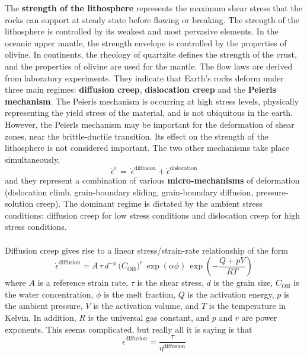 \documentclass[letterpaper,12pt,]{memoir}
\begin{document}
The \textbf{strength of the lithosphere} represents the maximum shear stress that the rocks can support at steady state before flowing or breaking. The strength of the lithosphere is controlled by its weakest and most pervasive elements. In the oceanic upper mantle, the strength envelope is controlled by the properties of olivine. In continents, the rheology of quartzite defines the strength of the crust, and the properties of olivine are used for the mantle. The flow laws are derived from laboratory experiments. They indicate that Earth's rocks deform under three main regimes: \textbf{diffusion creep}, \textbf{dislocation creep} and the \textbf{Peierls mechanism}. The Peierls mechanism is occurring at high stress levels, physically representing the yield stress of the material, and is not ubiquitous in the earth. However, the Peierls mechanism may be important for the deformation of shear zones, near the brittle-ductile transition. Its effect on the strength of the lithosphere is not considered important. The two other mechanisms take place simultaneously, 
\begin{equation}
\dot{\epsilon}^i\,=~\dot{\epsilon}^\text{diffusion}+\dot{\epsilon}^\text{dislocation}
\end{equation}
and they represent a combination of various \textbf{micro-mechanisms} of deformation (dislocation climb, grain-boundary sliding, grain-boundary diffusion, pressure-solution creep). The dominant regime is dictated by the ambient stress conditions: diffusion creep for low stress conditions and dislocation creep for high stress conditions.\\
\\
Diffusion creep gives rise to a linear stress/strain-rate relationship of the form
\begin{equation}
\dot{\epsilon}^\text{diffusion}=A\,\tau\,d^{-p}\,\big(C_\text{OH}\big)^r\,\exp\left(\alpha\phi\right)\,\exp\left(-\frac{Q+pV}{RT}\right)
\end{equation}
where $A$ is a reference strain rate, $\tau$ is the shear stress, $d$ is the grain size, $C_\text{OH}$ is the water concentration, $\phi$ is the melt fraction, $Q$ is the activation energy, $p$ is the ambient pressure, $V$ is the activation volume, and $T$ is the temperature in Kelvin. In addition, $R$ is the universal gas constant, and $p$ and $r$ are power exponents. This seems complicated, but really all it is saying is that
\begin{equation}
\dot{\epsilon}^\text{diffusion}=\frac{\tau}{\eta^\text{diffusion}}
\end{equation}
\end{document}
